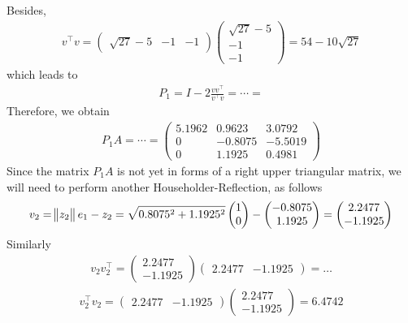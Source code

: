 \documentclass[12pt]{article}
\begin{document}
Besides, 
\begin{align}
	v^{\top}v = 
	\begin{pmatrix} \sqrt{27}-5 & -1 & -1 \end{pmatrix}
	\begin{pmatrix} \sqrt{27}-5 \\ -1 \\ -1 \end{pmatrix}
	= 54-10\sqrt{27}
\end{align}
which leads to 
\begin{align}
	P_1 = I -2 \frac{vv^{\top}}{v^{\top}v} = \cdots = 
\end{align}
Therefore, we obtain 
\begin{align}
	\boxed{
		P_1A 
		= \cdots 
		= \begin{pmatrix} 5.1962 & 0.9623 & 3.0792 \\ 0 &-0.8075 & -5.5019 \\ 0 &1.1925 &0.4981 \end{pmatrix}
	}
\end{align}
Since the matrix $P_1A$ is not yet in forms of a right upper triangular matrix,
we will need to perform another Householder-Reflection, as follows 
\begin{align}
	v_2 
	= \norm[1]{z_2}e_1 - z_2 
	= \sqrt{0.8075^2 + 1.1925^2}
	\begin{pmatrix} 1 \\ 0  \end{pmatrix}
	- 
	\begin{pmatrix} -0.8075 \\ 1.1925 \end{pmatrix}
	=
	\begin{pmatrix} 2.2477 \\ -1.1925  \end{pmatrix}
\end{align}
Similarly
\begin{align}
	v_2v_2^{\top} =	
	\begin{pmatrix} 2.2477 \\ -1.1925  \end{pmatrix}
	\begin{pmatrix} 2.2477 & -1.1925  \end{pmatrix}
	= \dots 
\end{align}
\begin{align}
	v_2^{\top}v_2 =	
	\begin{pmatrix} 2.2477 & -1.1925  \end{pmatrix}
	\begin{pmatrix} 2.2477 \\ -1.1925  \end{pmatrix}
	= 6.4742
\end{align}
\end{document}
